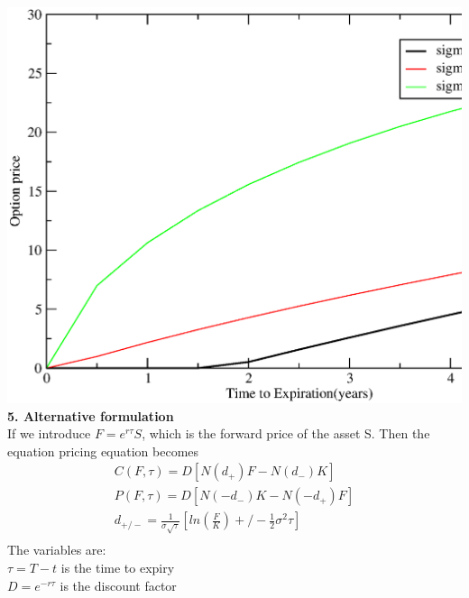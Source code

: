 \documentclass[a4paper]{article}
\begin{document}
\includegraphics[scale = 0.5]{option_price2.eps}\\
{\bf 5. Alternative formulation}\\
If we introduce $F = e^{r\tau} S$, which is the forward price of the asset S. Then the equation pricing equation becomes
\begin{align*}
	C(F,\tau)= D[N(d_+)F - N(d_-)K] \\
	P(F,\tau)= D[N(-d_-)K - N(-d_+)F] \\
	d_{+/-} = \frac{1}{\sigma \sqrt{\tau}}[ln(\frac{F}{K})+/-\frac{1}{2}\sigma^2 \tau] \\
\end{align*}
The variables are:\\
$\tau = T - t$ is the time to expiry\\
$D = e^{-r\tau}$ is the discount factor \\
\end{document}
